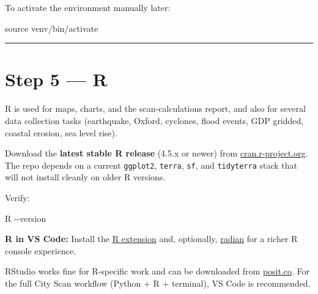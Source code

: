 \documentclass[
  letterpaper,
  DIV=11,
  numbers=noendperiod]{scrreprt}
\newenvironment{Shaded}{\begin{snugshade}}{\end{snugshade}}
\newcommand{\AttributeTok}[1]{\textcolor[rgb]{0.40,0.45,0.13}{#1}}
\newcommand{\BuiltInTok}[1]{\textcolor[rgb]{0.00,0.23,0.31}{#1}}
\newcommand{\ExtensionTok}[1]{\textcolor[rgb]{0.00,0.23,0.31}{#1}}
\newcommand{\NormalTok}[1]{\textcolor[rgb]{0.00,0.23,0.31}{#1}}
\begin{document}
To activate the environment manually later:

\begin{Shaded}
\begin{Highlighting}[]
\BuiltInTok{source}\NormalTok{ venv/bin/activate}
\end{Highlighting}
\end{Shaded}

\begin{center}\rule{0.5\linewidth}{0.5pt}\end{center}

\section{Step 5 --- R}\label{step-5-r}

R is used for maps, charts, and the scan-calculations report, and also
for several data collection tasks (earthquake, Oxford, cyclones, flood
events, GDP gridded, coastal erosion, sea level rise).

Download the \textbf{latest stable R release} (4.5.x or newer) from
\href{https://cran.r-project.org/}{cran.r-project.org}. The repo depends
on a current \texttt{ggplot2}, \texttt{terra}, \texttt{sf}, and
\texttt{tidyterra} stack that will not install cleanly on older R
versions.

Verify:

\begin{Shaded}
\begin{Highlighting}[]
\ExtensionTok{R} \AttributeTok{{-}{-}version}
\end{Highlighting}
\end{Shaded}

\textbf{R in VS Code:} Install the
\href{https://marketplace.visualstudio.com/items?itemName=REditorSupport.r}{R
extension} and, optionally,
\href{https://github.com/randy3k/radian}{radian} for a richer R console
experience.

\begin{tcolorbox}[enhanced jigsaw, arc=.35mm, bottomrule=.15mm, bottomtitle=1mm, breakable, colback=white, colbacktitle=quarto-callout-note-color!10!white, colframe=quarto-callout-note-color-frame, coltitle=black, left=2mm, leftrule=.75mm, opacityback=0, opacitybacktitle=0.6, rightrule=.15mm, title=\textcolor{quarto-callout-note-color}{\faInfo}\hspace{0.5em}{Note}, titlerule=0mm, toprule=.15mm, toptitle=1mm]

RStudio works fine for R-specific work and can be downloaded from
\href{https://posit.co/download/rstudio-desktop/}{posit.co}. For the
full City Scan workflow (Python + R + terminal), VS Code is recommended.

\end{tcolorbox}
\end{document}
